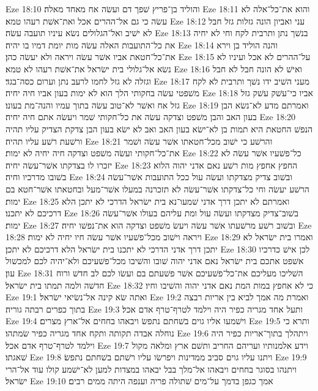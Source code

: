 Eze 18:10  והוליד בן־פריץ שׁפך דם ועשׂה אח מאחד מאלה׃
Eze 18:11  והוא את־כל־אלה לא עשׂה כי גם אל־ההרים אכל ואת־אשׁת רעהו טמא׃
Eze 18:12  עני ואביון הונה גזלות גזל חבל לא ישׁיב ואל־הגלולים נשׂא עיניו תועבה עשׂה׃
Eze 18:13  בנשׁך נתן ותרבית לקח וחי לא יחיה את כל־התועבות האלה עשׂה מות יומת דמיו בו יהיה׃
Eze 18:14  והנה הוליד בן וירא את־כל־חטאת אביו אשׁר עשׂה ויראה ולא יעשׂה כהן׃
Eze 18:15  על־ההרים לא אכל ועיניו לא נשׂא אל־גלולי בית ישׂראל את־אשׁת רעהו לא טמא׃
Eze 18:16  ואישׁ לא הונה חבל לא חבל וגזלה לא גזל לחמו לרעב נתן וערום כסה־בגד׃
Eze 18:17  מעני השׁיב ידו נשׁך ותרבית לא לקח משׁפטי עשׂה בחקותי הלך הוא לא ימות בעון אביו חיה יחיה׃
Eze 18:18  אביו כי־עשׁק עשׁק גזל גזל אח ואשׁר לא־טוב עשׂה בתוך עמיו והנה־מת בעונו׃
Eze 18:19  ואמרתם מדע לא־נשׂא הבן בעון האב והבן משׁפט וצדקה עשׂה את כל־חקותי שׁמר ויעשׂה אתם חיה יחיה׃
Eze 18:20  הנפשׁ החטאת היא תמות בן לא־ישׂא בעון האב ואב לא ישׂא בעון הבן צדקת הצדיק עליו תהיה ורשׁעת רשׁע עליו תהיה׃
Eze 18:21  והרשׁע כי ישׁוב מכל־חטאתו אשׁר עשׂה ושׁמר את־כל־חקותי ועשׂה משׁפט וצדקה חיה יחיה לא ימות׃
Eze 18:22  כל־פשׁעיו אשׁר עשׂה לא יזכרו לו בצדקתו אשׁר־עשׂה יחיה׃
Eze 18:23  החפץ אחפץ מות רשׁע נאם אדני יהוה הלוא בשׁובו מדרכיו וחיה׃
Eze 18:24  ובשׁוב צדיק מצדקתו ועשׂה עול ככל התועבות אשׁר־עשׂה הרשׁע יעשׂה וחי כל־צדקתו אשׁר־עשׂה לא תזכרנה במעלו אשׁר־מעל ובחטאתו אשׁר־חטא בם ימות׃
Eze 18:25  ואמרתם לא יתכן דרך אדני שׁמעו־נא בית ישׂראל הדרכי לא יתכן הלא דרכיכם לא יתכנו׃
Eze 18:26  בשׁוב־צדיק מצדקתו ועשׂה עול ומת עליהם בעולו אשׁר־עשׂה ימות׃
Eze 18:27  ובשׁוב רשׁע מרשׁעתו אשׁר עשׂה ויעשׂ משׁפט וצדקה הוא את־נפשׁו יחיה׃
Eze 18:28  ויראה וישׁוב מכל־פשׁעיו אשׁר עשׂה חיו יחיה לא ימות׃
Eze 18:29  ואמרו בית ישׂראל לא יתכן דרך אדני הדרכי לא יתכנו בית ישׂראל הלא דרכיכם לא יתכן׃
Eze 18:30  לכן אישׁ כדרכיו אשׁפט אתכם בית ישׂראל נאם אדני יהוה שׁובו והשׁיבו מכל־פשׁעיכם ולא־יהיה לכם למכשׁול עון׃
Eze 18:31  השׁליכו מעליכם את־כל־פשׁעיכם אשׁר פשׁעתם בם ועשׂו לכם לב חדשׁ ורוח חדשׁה ולמה תמתו בית ישׂראל׃
Eze 18:32  כי לא אחפץ במות המת נאם אדני יהוה והשׁיבו וחיו׃
Eze 19:1  ואתה שׂא קינה אל־נשׂיאי ישׂראל׃
Eze 19:2  ואמרת מה אמך לביא בין אריות רבצה בתוך כפרים רבתה גוריה׃
Eze 19:3  ותעל אחד מגריה כפיר היה וילמד לטרף־טרף אדם אכל׃
Eze 19:4  וישׁמעו אליו גוים בשׁחתם נתפשׂ ויבאהו בחחים אל־ארץ מצרים׃
Eze 19:5  ותרא כי נוחלה אבדה תקותה ותקח אחד מגריה כפיר שׂמתהו׃
Eze 19:6  ויתהלך בתוך־אריות כפיר היה וילמד לטרף־טרף אדם אכל׃
Eze 19:7  וידע אלמנותיו ועריהם החריב ותשׁם ארץ ומלאה מקול שׁאגתו׃
Eze 19:8  ויתנו עליו גוים סביב ממדינות ויפרשׂו עליו רשׁתם בשׁחתם נתפשׂ׃
Eze 19:9  ויתנהו בסוגר בחחים ויבאהו אל־מלך בבל יבאהו במצדות למען לא־ישׁמע קולו עוד אל־הרי ישׂראל׃
Eze 19:10  אמך כגפן בדמך על־מים שׁתולה פריה וענפה היתה ממים רבים׃
